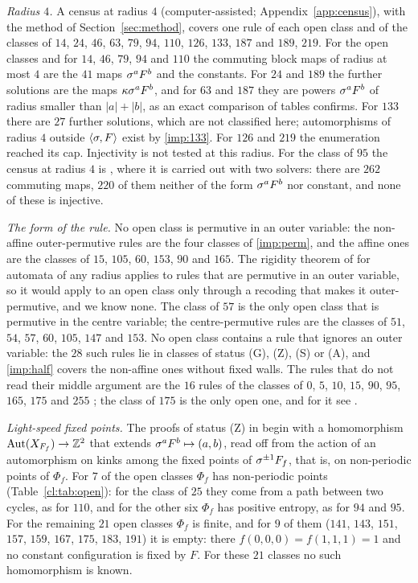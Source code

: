 \emph{Radius $4$.} A census at radius $4$ (computer-assisted; Appendix~\ref{app:census}), with the method of Section~\ref{sec:method}, covers one rule of each open class and of the classes of $14$, $24$, $46$, $63$, $79$, $94$, $110$, $126$, $133$, $187$ and $189$, $219$. For the open classes and for $14$, $46$, $79$, $94$ and $110$ the commuting block maps of radius at most $4$ are the $41$ maps $\sigma^aF^b$ and the constants. For $24$ and $189$ the further solutions are the maps $\kappa\sigma^aF^b$, and for $63$ and $187$ they are powers $\sigma^aF^b$ of radius smaller than $|a|+|b|$, as an exact comparison of tables confirms. For $133$ there are $27$ further solutions, which are not classified here; automorphisms of radius $4$ outside $\langle\sigma,F\rangle$ exist by \eqref{imp:133}. For $126$ and $219$ the enumeration reached its cap. Injectivity is not tested at this radius. For the class of $95$ the census at radius $4$ is \cite[Lemma~6.20, Proposition~6.21(a)]{PaperE}, where it is carried out with two solvers: there are $262$ commuting maps, $220$ of them neither of the form $\sigma^aF^b$ nor constant, and none of these is injective.

\emph{The form of the rule.} No open class is permutive in an outer variable: the non-affine outer-permutive rules are the four classes of \eqref{imp:perm}, and the affine ones are the classes of $15$, $105$, $60$, $153$, $90$ and $165$. The rigidity theorem of \cite{PaperB} for automata of any radius applies to rules that are permutive in an outer variable, so it would apply to an open class only through a recoding that makes it outer-permutive, and we know none. The class of $57$ is the only open class that is permutive in the centre variable; the centre-permutive rules are the classes of $51$, $54$, $57$, $60$, $105$, $147$ and $153$. No open class contains a rule that ignores an outer variable: the $28$ such rules lie in classes of status (G), (Z), (S) or (A), and \eqref{imp:half} covers the non-affine ones without fixed walls. The rules that do not read their middle argument are the $16$ rules of the classes of $0$, $5$, $10$, $15$, $90$, $95$, $165$, $175$ and $255$ \cite[p.~386]{Takesue1989}; the class of $175$ is the only open one, and for it see \cite[Remark~6.22]{PaperE}.

\emph{Light-speed fixed points.} The proofs of status (Z) in \cite{PaperA,PaperE} begin with a homomorphism $\operatorname{Aut}(X_{F_f})\to\mathbb{Z}^2$ that extends $\sigma^aF^b\mapsto(a,b)$, read off from the action of an automorphism on kinks among the fixed points of $\sigma^{\pm1}F_f$, that is, on non-periodic points of $\Phi_f$. For $7$ of the open classes $\Phi_f$ has non-periodic points (Table~\ref{cl:tab:open}): for the class of $25$ they come from a path between two cycles, as for $110$, and for the other six $\Phi_f$ has positive entropy, as for $94$ and $95$. For the remaining $21$ open classes $\Phi_f$ is finite, and for $9$ of them ($141$, $143$, $151$, $157$, $159$, $167$, $175$, $183$, $191$) it is empty: there $f(0,0,0)=f(1,1,1)=1$ and no constant configuration is fixed by $F$. For these $21$ classes no such homomorphism is known.

